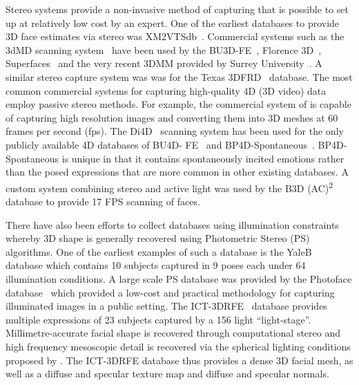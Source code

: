 Stereo systems provide a non-invasive method of capturing that is possible to
set up at relatively low cost by an expert. One of the earliest databases to
provide 3D face estimates via stereo was XM2VTSdb~\cite{messer1999xm2vtsdb}. 
Commercial systems such as the 3dMD scanning system~\cite{3dmd} have been used
by the BU3D-FE~\cite{Yin:2006cc}, Florence 3D~\cite{bagdanov2011florence},
Superfaces~\cite{berretti2012superfaces} and the very recent 3DMM provided by
Surrey University~\cite{Huber:F5Dca9zy}. A similar stereo capture system was was
for the Texas 3DFRD~\cite{gupta2010anthropometric} database. The most common
commercial systems for capturing high-quality 4D (3D video) data employ passive
stereo methods. For example, the commercial
system of \citet{di4d} is capable of capturing high resolution images and
converting them into 3D meshes at 60 frames per second (fps). 
The Di4D~\cite{di4d} scanning system
has been used for the only publicly available 4D databases of BU4D-
FE~\cite{yin2008high} and BP4D-Spontaneous~\cite{Zhang:2014id}. BP4D-Spontaneous
is unique in that it contains spontaneously incited emotions rather than the
posed expressions that are more common in other existing databases. A custom
system combining stereo and active light was used by the B3D
(AC)\textsuperscript{2}~\cite{weise2007fast,fanelli2013random} database to
provide 17 FPS scanning of faces.

There have also been efforts to collect databases using illumination constraints
whereby 3D shape is generally recovered using 
Photometric Stereo (PS)~\cite{woodham1980photometric}
algorithms. One of the earliest examples of such a database is the 
YaleB~\cite{RefWorks:314} database which contains 10 subjects captured in 
9 poses each under 64 illumination conditions. A large scale PS database was
provided by the Photoface database~\cite{RefWorks:293} which provided a low-cost
and practical methodology for capturing illuminated images in a public setting.
The ICT-3DRFE~\cite{stratou2012exploring} database provides multiple expressions
of 23 subjects captured by a 156 light ``light-stage''. Millimetre-accurate
facial shape is recovered through computational stereo and high frequency 
mesoscopic detail is recovered via the spherical lighting conditions proposed
by \citet{ma2007rapid}. The ICT-3DRFE database thus provides a dense 
3D facial mesh, as well as a diffuse and specular texture map and diffuse and
specular normals.
